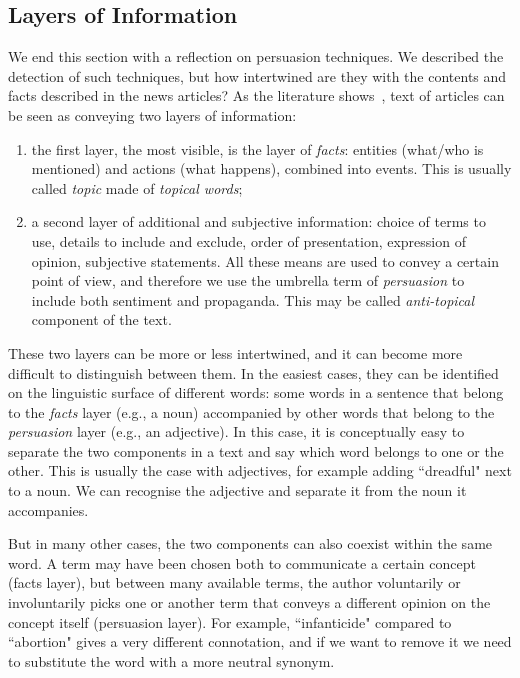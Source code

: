 \subsection{\statusgreen Layers of Information}
\label{ssec:lit_layers_of_info}
We end this section with a reflection on persuasion techniques.
We described the detection of such techniques, but how intertwined are they with the contents and facts described in the news articles?
As the literature shows~\citep{jenkins2013thin,vanderwicken1995news,jang2023proximate}, text of articles can be seen as conveying two layers of information:
\begin{enumerate}
    \item the first layer, the most visible, is the layer of \emph{facts}: entities (what/who is mentioned) and actions (what happens), combined into events. This is usually called \emph{topic} made of \emph{topical words};
    \item a second layer of additional and subjective information: choice of terms to use, details to include and exclude, order of presentation, expression of opinion, subjective statements. All these means are used to convey a certain point of view, and therefore we use the umbrella term of \emph{persuasion} to include both sentiment and propaganda. This may be called \emph{anti-topical} component of the text.
\end{enumerate}



These two layers can be more or less intertwined, and it can become more difficult to distinguish between them.
In the easiest cases, they can be identified on the linguistic surface of different words: some words in a sentence that belong to the \emph{facts} layer (e.g., a noun) accompanied by other words that belong to the \emph{persuasion} layer (e.g., an adjective).
In this case, it is conceptually easy to separate the two components in a text and say which word belongs to one or the other.
This is usually the case with adjectives, for example adding ``dreadful" next to a noun. We can recognise the adjective and separate it from the noun it accompanies.

But in many other cases, the two components can also coexist within the same word. A term may have been chosen both to communicate a certain concept (facts layer), but between many available terms, the author voluntarily or involuntarily picks one or another term that conveys a different opinion on the concept itself (persuasion layer).
For example, ``infanticide" compared to ``abortion" gives a very different connotation, and if we want to remove it we need to substitute the word with a more neutral synonym.

